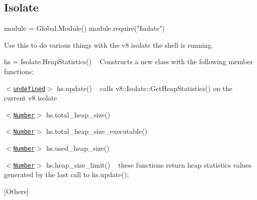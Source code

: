 \subsection*{Isolate}


\begin{DoxyCode}
module = Global.Module()
module.require("Isolate")
\end{DoxyCode}
 Use this to do various things with the v8 isolate the shell is running.
\begin{DoxyItemize}
\item {\ttfamily hs = Isolate.\+Heap\+Statistics()} ~\newline
 Constructs a new class with the following member functions\+: ~\newline

\begin{DoxyItemize}
\item \href{https://developer.mozilla.org/en-US/docs/Web/JavaScript/Reference/Global_Objects/undefined}{\tt {\ttfamily $<$undefined$>$}} {\ttfamily hs.\+update()} ~\newline
 calls {\ttfamily v8\+::\+Isolate\+::\+Get\+Heap\+Statistics()} on the current v8 isolate ~\newline
~\newline

\item \href{https://developer.mozilla.org/en-US/docs/Web/JavaScript/Data_structures#Number_type}{\tt {\ttfamily $<$Number$>$}} {\ttfamily hs.\+total\+\_\+heap\+\_\+size()}
\item \href{https://developer.mozilla.org/en-US/docs/Web/JavaScript/Data_structures#Number_type}{\tt {\ttfamily $<$Number$>$}} {\ttfamily hs.\+total\+\_\+heap\+\_\+size\+\_\+executable()}
\item \href{https://developer.mozilla.org/en-US/docs/Web/JavaScript/Data_structures#Number_type}{\tt {\ttfamily $<$Number$>$}} {\ttfamily hs.\+used\+\_\+heap\+\_\+size()}
\item \href{https://developer.mozilla.org/en-US/docs/Web/JavaScript/Data_structures#Number_type}{\tt {\ttfamily $<$Number$>$}} {\ttfamily hs.\+heap\+\_\+size\+\_\+limit()} ~\newline
 these functions return heap statistics values generated by the last call to {\ttfamily hs.\+update()}\+: ~\newline

\end{DoxyItemize}
\item \mbox{[}Others\mbox{]}
\end{DoxyItemize}





